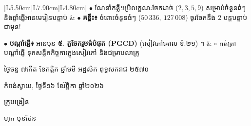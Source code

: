 \documentclass[a4paper,10pt]{article}
\newcommand{\en}[1]{{\TimesEn #1}}
\begin{document}
{\begin{longtable}{|L{5.50cm}|L{7.90cm}|L{4.80cm}|}
$\bullet$ ណែនាំគន្លឹះប្រើលក្ខណៈចែកដាច់ ($2, 3, 5, 9$) សម្រាប់ចំនួនធំៗ និងផ្ដាំផ្ញើអានមេរៀនបន្ទាប់
&
$\bullet$ \textbf{គន្លឹះ៖} ចំពោះចំនួនធំៗ ($50\,336,\ 127\,008$) ចូរចែកនឹង $2$ បន្តបន្ទាប់ជាមុន! \par
$\bullet$ \textbf{បណ្ដាំផ្ញើ៖} អានមុន \textbf{៥. តួចែករួមធំបំផុត (\en{PGCD})} (សៀវភៅគោល ទំ.២១) ។
&
$\circ$ កត់ត្រាបណ្ដាំផ្ញើ ទុកសន្លឹកកិច្ចការក្នុងសៀវភៅ និងជម្រាបលាគ្រូ \\
\hline
\end{longtable}}

\vspace{6pt}
{\centering
\hspace*{5.2cm}\begin{minipage}{11.5cm}
  \centering
  ថ្ងៃចន្ទ ៧កើត ខែកត្តិក ឆ្នាំមមី អដ្ឋស័ក ពុទ្ធសករាជ ២៥៧០\par
  កំពង់ស្វាយ, ថ្ងៃទី១៦ ខែវិច្ឆិកា ឆ្នាំ២០២៦\par
  \vspace{2pt}
  {\muol គ្រូបង្រៀន\par}
  \vspace{32pt}
  \hfill{\muol ហុក ប៊ុនថែន}\hspace*{1.4cm}
\end{minipage}\par}
\end{document}
